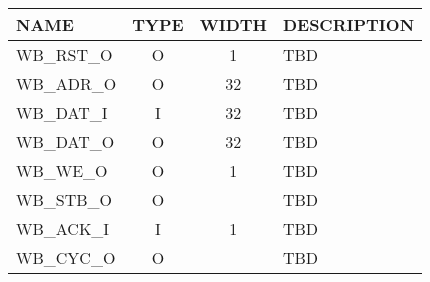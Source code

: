 {
\footnotesize
\begin{tabularx}{0.9\textwidth}{|l|c|c|X|}
  \hline
  \cellcolor{gray!20}\textbf{NAME} & \cellcolor{gray!20}\textbf{TYPE} & \cellcolor{gray!20}\textbf{WIDTH} & \cellcolor{gray!20}\textbf{DESCRIPTION} \\
  \hline
  WB\_RST\_O & O & 1 & TBD \\
  \hline
  WB\_ADR\_O & O & 32 & TBD \\
  \hline
  WB\_DAT\_I & I & 32 & TBD \\
  \hline
  WB\_DAT\_O & O & 32 & TBD \\
  \hline
  WB\_WE\_O & O & 1 & TBD \\
  \hline
  WB\_STB\_O & O &  & TBD \\
  \hline
  WB\_ACK\_I & I & 1 & TBD \\
  \hline
  WB\_CYC\_O & O &  & TBD \\
  \hline
\end{tabularx}
}
